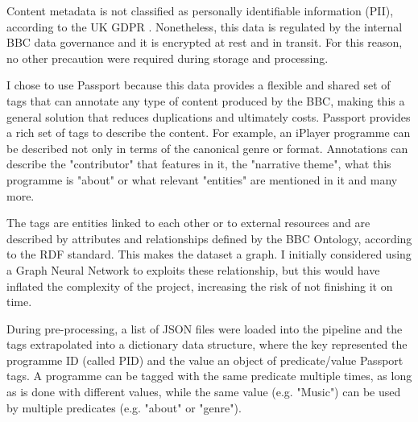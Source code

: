 Content metadata is not classified as personally identifiable information (PII), according to the UK GDPR \cite{UKGDPR}. Nonetheless,
this data is regulated by the internal BBC data governance and it is encrypted at rest and in transit. For this reason, no other precaution
were required during storage and processing.

I chose to use Passport because this data provides a flexible and shared set of tags that can annotate any type of content produced by the BBC,
making this a general solution that reduces duplications and ultimately costs. Passport provides a rich set of tags to describe
the content. For example, an iPlayer programme can be described not only in terms of the canonical genre or format. Annotations can describe
the "contributor" that features in it, the "narrative theme", what this programme is "about" or what relevant "entities" are mentioned in it
and many more.

The tags are entities linked to each other or to external resources and are described by attributes and relationships defined by the BBC Ontology,
according to the RDF \cite{W3C:RDF,W3C:RDF:Concepts} standard.
This makes the dataset a graph. I initially considered using a Graph Neural Network to exploits these relationship,
but this would have inflated the complexity of the project, increasing the risk of not finishing it on time.

During pre-processing, a list of JSON files were loaded into the pipeline and the tags extrapolated into a dictionary data structure, where the key represented
the programme ID (called PID) and the value an object of predicate/value Passport tags. A programme can be tagged with the same predicate multiple times,
as long as is done with different values, while the same value (e.g. "Music") can be used by multiple predicates (e.g. "about" or "genre").

